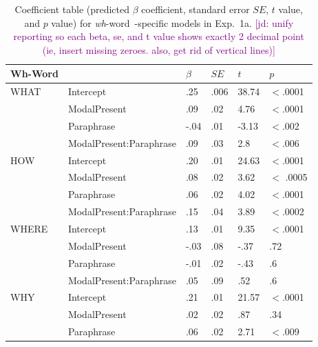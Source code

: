 \documentclass[12pt,letterpaper,table,svgnames,dvipsnames]{article}
\newcommand{\jd}[1]{\textcolor{Purple}{[jd: #1]}}
\newcommand{\whw}{\emph{wh}-word~}
\begin{document}
\begin{table}[p!]
\begin{center} 
\caption{Coefficient table (predicted $\beta$ coefficient, standard error $SE$, $t$ value, and $p$ value) for \whw-specific models in Exp.~1a. \jd{unify reporting so each beta, se, and t value shows exactly 2 decimal point (ie, insert missing zeroes. also, get rid of vertical lines)}} %
\label{sub-model_res_ex1a} 
\begin{tabular}{l|lllll} 
\toprule
Wh-Word & {} & $\beta$ & $SE$ & $t$ & $p$\\
\midrule
WHAT & Intercept & .25 & .006 & 38.74 & $<$.0001\\
{} & ModalPresent & .09 & .02 & 4.76 & $<$.0001\\
{} & Paraphrase & -.04 & .01 & -3.13 & $<$.002\\
{} & ModalPresent:Paraphrase & .09 & .03 & 2.8 & $<$.006\\
\bottomrule
\toprule
HOW & Intercept & .20 & .01 & 24.63 & $<$.0001\\
{} & ModalPresent & .08 & .02 & 3.62 & $<$ .0005\\
{} & Paraphrase & .06 & .02 & 4.02 & $<$.0001\\
{} & ModalPresent:Paraphrase & .15 & .04 & 3.89 & $<$.0002\\
\toprule
WHERE & Intercept & .13 & .01 & 9.35 & $<$.0001\\
{} & ModalPresent & -.03 & .08 & -.37 & .72\\
{} & Paraphrase & -.01 & .02 & -.43 & .6\\
{} & ModalPresent:Paraphrase & .05 & .09 & .52 & .6\\
\bottomrule
\toprule
WHY & Intercept & .21 & .01 & 21.57 & $<$.0001\\
{} & ModalPresent & .02 & .02 & .87 & .34\\
{} & Paraphrase & .06 & .02 & 2.71 & $<$.009\\

\end{tabular}
\end{center}
\end{table}
\end{document}
